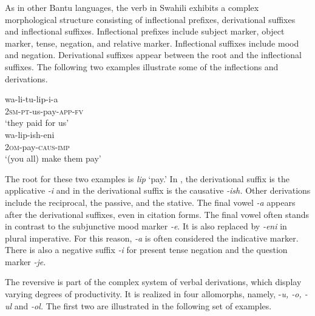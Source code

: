 \documentclass[output=paper]{langsci/langscibook}
\begin{document}
As in other Bantu languages, the verb in Swahili exhibits a complex morphological structure consisting of inflectional prefixes, derivational suffixes and inflectional suffixes. Inflectional prefixes include subject marker, object marker, tense, negation, and relative marker. Inflectional suffixes include mood and negation. Derivational suffixes appear between the root and the inflectional suffixes. The following two examples illustrate some of the inflections and derivations.

\ea\label{ex:ngonyaningowa:2}
\ea\label{ex:ngonyaningowa:2a}
\gll wa-li-tu-lip-i-a \\
  2\textsc{sm}-\textsc{pt}-us-pay-\textsc{app}-\textsc{fv} \\
\glt  ‘they paid for us’ \\

\ex\label{ex:ngonyaningowa:2b}  
\gll wa-lip-ish-eni \\
  2\textsc{om}-pay-\textsc{caus}-\textsc{imp} \\
\glt  ‘(you all) make them pay’ 
\z
\z 

The root for these two examples is \textit{lip} ‘pay.’ In , the derivational suffix is the applicative \textit{-i} and in  the derivational suffix is the causative \textit{-ish.} Other derivations include the reciprocal, the passive, and the stative. The final vowel \textit{-a} appears after the derivational suffixes, even in citation forms. The final vowel often stands in contrast to the subjunctive mood marker \textit{-e}. It is also replaced by \textit{-eni} in plural imperative. For this reason, \textit{-a} is often considered the indicative marker. There is also a negative suffix \textit{-i} for present tense negation and the question marker \textit{-je}.

The reversive is part of the complex system of verbal derivations, which display varying degrees of productivity. It is realized in four allomorphs, namely, -\textit{u, -o, -ul} and \textit{-ol.} The first two are illustrated in the following set of examples.

\ea\label{ex:ngonyaningowa:3}
\ea\label{ex:ngonyaningowa:3a}  
\ex\label{ex:ngonyaningowa:3b}
\ex\label{ex:ngonyaningowa:3c}
\ex\label{ex:ngonyaningowa:3d}
\ex\label{ex:ngonyaningowa:3e}
\z
\z
\end{document}
